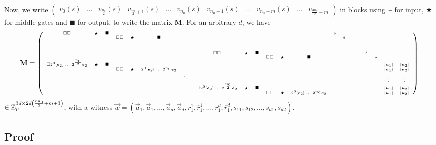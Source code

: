Now, we write $\left(\begin{array}{ccccccccccc}v_0(s) & \dots &  v_{\frac{n_0}{2}}(s)&  v_{\frac{n_0}{2}+1}(s)&\dots &  v_{n_0}(s) & v_{n_0+1}(s) & \dots & v_{n_0+m}(s)& \dots& v_{\frac{3n_0}{2}+m}\end{array}\right)$ in blocks using $\square \square$ for input, $\bigstar$ for middle gates and $\blacksquare$ for output, to write the matrix $\mathbf{M}$. For an arbitrary $d$, we have
$$\mathbf{M}=\left(\tiny\begin{array}{ccc ccc c ccc ccc cc c cc cc}
\square\square & \bigstar & \blacksquare & & &  &  & & &  & & & &\delta & &  & &  & &\\
& & & \square\square & \bigstar & \blacksquare   &  & & &  & & & &  &\delta & &  &  & &\\
& & & & & & \ddots & & &  & & &  & & &\ddots &  &  & &\\
& & &  &  &    &  &\square\square &\bigstar &\blacksquare  & & &  & & & & \delta &  & &\\
& & &  &  &    &  & & &  &\square \square& \bigstar& \blacksquare & & & &  & \delta & &\\
\square 2^0[\vec{e}_2]\dots 2^{\frac{n_0}{2}} \vec{e}_2 & \bigstar & \blacksquare & & &  &  & & &  & & & & &  & & & &[\vec{u}_1] &[\vec{u}_2]\\
& & & \square\square & \bigstar&2^0[\vec{e}_2]\dots 2^{n_0} \vec{e}_2 &  & & &  & & & & &  & &  & &[\vec{u}_1] &[\vec{u}_2]\\
& & & & & & \ddots & & &  & & &  & & & &  &  &\vdots &\vdots\\
& & &  & & & &\square 2^0[\vec{e}_2]\dots 2^{\frac{n_0}{2}} \vec{e}_2 & \bigstar & \blacksquare & & & & & & & & & [\vec{u}_1] &[\vec{u}_2] \\
& & &  & & & & & & &\square \square & \bigstar & 2^0[\vec{e}_2]\dots 2^{n_0} \vec{e}_2  & & & & & & [\vec{u}_1] &[\vec{u}_2] \\
\end{array}\right)$$
$\in \mathbb{Z}_p^{3d\times 2d\left(\frac{3n_0}{2}+m+3\right)}$, with a witness $\vec{w}=\left(\vec{a}_1,\overline{\vec{a}}_1,\dots,\vec{a}_d,\overline{\vec{a}}_d,r_1^1,\overline{r}_1^1,\dots,r_1^d,\overline{r}_1^d,s_{11},s_{12},\dots,s_{d1},s_{d2}\right)$.



\subsection{Proof}

